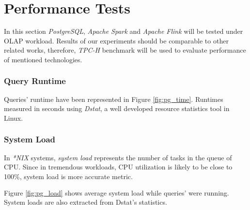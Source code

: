 \documentclass[report.tex]{subfiles}
\begin{document}
\section{Performance Tests}

In this section \textit{PostgreSQL}\cite{postgres}, \textit{Apache Spark}\cite{spark} and \textit{Apache Flink}\cite{flink} will be tested under OLAP workload. Results of our experiments should be comparable to other related works, therefore, \textit{TPC-H}\cite{tpch} benchmark will be used to evaluate performance of mentioned technologies.

\subsubsection{Query Runtime}
Queries' runtime have been represented in Figure \ref{fig:pg_time}. Runtimes measured in seconds using \textit{Dstat}\cite{dstat}, a well developed resource statistics tool in Linux.


\subsubsection{System Load}
In \textit{*NIX} systems, \textit{system load} represents the number of tasks in the queue of CPU. Since in tremendous workloads, CPU utilization is likely to be close to 100\%, system load is more accurate metric.

Figure \ref{fig:pg_load} shows average system load while queries' were running. System loads are also extracted from Dstat's statistics.

\end{document}
